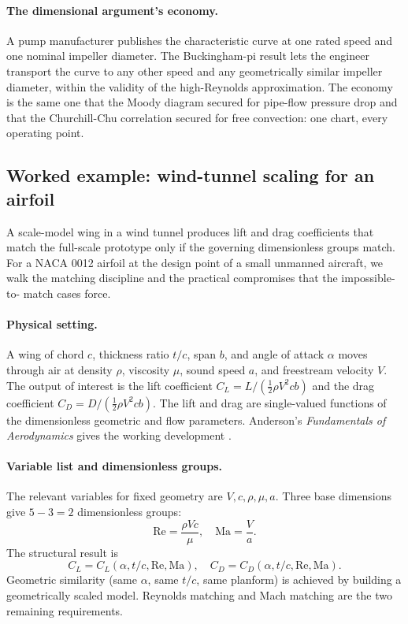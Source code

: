 \paragraph{The dimensional argument's economy.} A pump manufacturer
publishes the characteristic curve at one rated speed and one
nominal impeller diameter. The Buckingham-pi result lets the
engineer transport the curve to any other speed and any
geometrically similar impeller diameter, within the validity of
the high-Reynolds approximation. The economy is the same one
that the Moody diagram secured for pipe-flow pressure drop and that
the Churchill-Chu correlation secured for free convection: one
chart, every operating point.

\subsection{Worked example: wind-tunnel scaling for an airfoil}

A scale-model wing in a wind tunnel produces lift and drag
coefficients that match the full-scale prototype only if the
governing dimensionless groups match. For a NACA 0012 airfoil at
the design point of a small unmanned aircraft, we walk the matching
discipline and the practical compromises that the impossible-to-
match cases force.

\paragraph{Physical setting.} A wing of chord $c$, thickness ratio
$t/c$, span $b$, and angle of attack $\alpha$ moves through air at
density $\rho$, viscosity $\mu$, sound speed $a$, and freestream
velocity $V$. The output of interest is the lift coefficient
$C_{L} = L/(\tfrac{1}{2} \rho V^{2} c b)$ and the drag coefficient
$C_{D} = D/(\tfrac{1}{2} \rho V^{2} c b)$. The lift and drag are
single-valued functions of the dimensionless geometric and flow
parameters. Anderson's \emph{Fundamentals of Aerodynamics} gives
the working development \cite{text:ch02t3-anderson-fundamentals}.

\paragraph{Variable list and dimensionless groups.} The relevant
variables for fixed geometry are $V, c, \rho, \mu, a$. Three
base dimensions give $5 - 3 = 2$ dimensionless groups:
\[
\mathrm{Re} = \frac{\rho V c}{\mu}, \quad
\mathrm{Ma} = \frac{V}{a}.
\]
The structural result is
\[
C_{L} = C_{L}(\alpha, t/c, \mathrm{Re}, \mathrm{Ma}), \quad
C_{D} = C_{D}(\alpha, t/c, \mathrm{Re}, \mathrm{Ma}).
\]
Geometric similarity (same $\alpha$, same $t/c$, same planform)
is achieved by building a geometrically scaled model. Reynolds
matching and Mach matching are the two remaining requirements.

